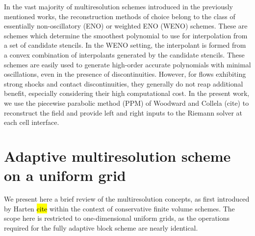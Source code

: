 \documentclass[]{article}
\begin{document}
        In the vast majority of multiresolution schemes introduced in the
        previously mentioned works, the reconstruction methods of choice belong
        to the class of essentially non-oscillatory (ENO) or weighted ENO
        (WENO) schemes. These are schemes which determine the smoothest
        polynomial to use for interpolation from a set of candidate stencils.
        In the WENO setting, the interpolant is formed from a convex
        combination of interpolants generated by the candidate stencils. These
        schemes are easily used to generate high-order accurate polynomials
        with minimal oscillations, even in the presence of discontinuities.
        However, for flows exhibiting strong shocks and contact
        discontinuities, they generally do not reap additional benefit,
        especially considering their high computational cost. In the
        present work, we use the piecewise parabolic method (PPM) of Woodward
        and Collela (cite) to reconstruct the field and provide left and
        right inputs to the Riemann solver at each cell interface.

%

\section{Adaptive multiresolution scheme on a uniform grid}

    We present here a brief review of the multiresolution concepts, as first
    introduced by Harten \hl{cite} within the context of conservative finite
    volume schemes. The scope here is restricted to one-dimensional uniform
    grids, as the operations required for the fully adaptive block scheme are
    nearly identical.
\end{document}

